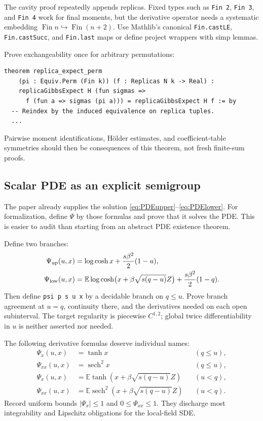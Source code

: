 \documentclass[11pt]{article}
\numberwithin{equation}{section}
\newcommand{\E}{\mathbb{E}}
\newcommand{\1}{\mathbf 1}
\begin{document}
The cavity proof repeatedly appends replicas.  Fixed types such as
\texttt{Fin 2}, \texttt{Fin 3}, and \texttt{Fin 4} work for final moments,
but the derivative operator needs a systematic embedding
$\operatorname{Fin} n\hookrightarrow\operatorname{Fin}(n+2)$.
Use Mathlib's canonical \texttt{Fin.castLE}, \texttt{Fin.castSucc}, and
\texttt{Fin.last} maps or define project wrappers with simp lemmas.

Prove exchangeability once for arbitrary permutations:
\begin{lstlisting}
theorem replica_expect_perm
    (pi : Equiv.Perm (Fin k)) (f : Replicas N k -> Real) :
    replicaGibbsExpect H (fun sigmas =>
      f (fun a => sigmas (pi a))) = replicaGibbsExpect H f := by
  -- Reindex by the induced equivalence on replica tuples.
  ...
\end{lstlisting}
Pairwise moment identifications, H\"older estimates, and coefficient-table
symmetries should then be consequences of this theorem, not fresh finite-sum
proofs.

\subsection{Scalar PDE as an explicit semigroup}

The paper already supplies the solution
\eqref{eq:PDEupper}--\eqref{eq:PDElower}.  For formalization, define $\Psi$
by those formulas and prove that it solves the PDE.  This is easier to audit
than starting from an abstract PDE existence theorem.

Define two branches:
\begin{align*}
 \Psi_{\rm up}(u,x)
 &=\log\cosh x+\frac{s\beta^2}{2}(1-u),\\
 \Psi_{\rm low}(u,x)
 &=\E\log\cosh\bigl(x+\beta\sqrt{s(q-u)}Z\bigr)
   +\frac{s\beta^2}{2}(1-q).
\end{align*}
Then define \texttt{psi p s u x} by a decidable branch on $q\le u$.
Prove branch agreement at $u=q$, continuity there, and the derivatives needed
on each open subinterval.  The target regularity is piecewise $C^{1,2}$;
global twice differentiability in $u$ is neither asserted nor needed.

The following derivative formulas deserve individual names:
\begin{align*}
 \Psi_x(u,x)&=\tanh x &&(q\le u),\\
 \Psi_{xx}(u,x)&=\operatorname{sech}^2x &&(q\le u),\\
 \Psi_x(u,x)&=\E\tanh(x+\beta\sqrt{s(q-u)}Z)&&(u<q),\\
 \Psi_{xx}(u,x)&=\E\operatorname{sech}^2
     (x+\beta\sqrt{s(q-u)}Z)&&(u<q).
\end{align*}
Record uniform bounds $|\Psi_x|\le1$ and $0\le\Psi_{xx}\le1$.  They discharge
most integrability and Lipschitz obligations for the local-field SDE.
\end{document}
